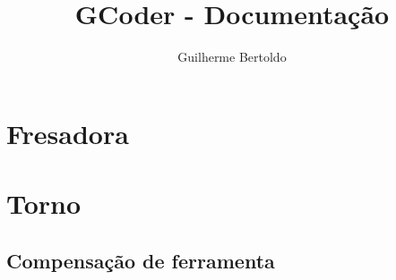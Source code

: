 \documentclass[12pt,a4paper]{book}
\author{Guilherme Bertoldo}
\title{GCoder - Documentação}
\begin{document}
	\maketitle
	\tableofcontents

\chapter{Fresadora}

\chapter{Torno}

\section{Compensação de ferramenta}
	
\end{document}
